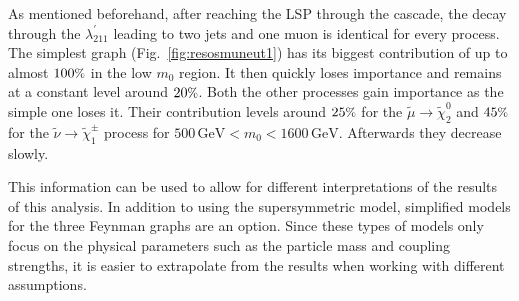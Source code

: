 \noindent As mentioned beforehand, after reaching the LSP through the cascade, the decay through the $\lambda^\prime_{211}$ leading to two jets and one muon is identical for every process. The simplest graph (Fig.~\ref{fig:resosmuneut1}) has its biggest contribution of up to almost $100\pct$ in the low $m_0$ region. It then quickly loses importance and remains at a constant level around $20\pct$. Both the other processes gain importance as the simple one loses it. Their contribution levels around $25\pct$ for the $\tilde{\mu} \rightarrow \tilde{\chi}^0_2$ and $45\pct$ for the $\tilde{\nu} \rightarrow \tilde{\chi}^\pm_1$ process for $500\,\text{GeV} < m_0 < 1600\,\text{GeV}$. Afterwards they decrease slowly.

This information can be used to allow for different interpretations of the results of this analysis. In addition to using the supersymmetric model, simplified models for the three Feynman graphs are an option. Since these types of models only focus on the physical parameters such as the particle mass and coupling strengths, it is easier to extrapolate from the results when working with different assumptions.



